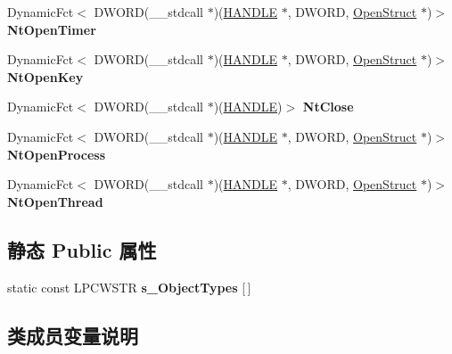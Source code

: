 \begin{DoxyCompactItemize}
\item 
\mbox{\label{struct_n_t_d_l_l_a043cad7dcc22e84d63e1c9cbe6cab085}} 
Dynamic\+Fct$<$ D\+W\+O\+RD(\+\_\+\+\_\+stdcall $\ast$)(\hyperlink{interfacevoid}{H\+A\+N\+D\+LE} $\ast$, D\+W\+O\+RD, \hyperlink{struct_open_struct}{Open\+Struct} $\ast$)$>$ {\bfseries Nt\+Open\+Timer}
\item 
\mbox{\label{struct_n_t_d_l_l_a61b5121698f86a91917ccb50536520f2}} 
Dynamic\+Fct$<$ D\+W\+O\+RD(\+\_\+\+\_\+stdcall $\ast$)(\hyperlink{interfacevoid}{H\+A\+N\+D\+LE} $\ast$, D\+W\+O\+RD, \hyperlink{struct_open_struct}{Open\+Struct} $\ast$)$>$ {\bfseries Nt\+Open\+Key}
\item 
\mbox{\label{struct_n_t_d_l_l_a85c90b85bb70246933e8ca0dce2451fc}} 
Dynamic\+Fct$<$ D\+W\+O\+RD(\+\_\+\+\_\+stdcall $\ast$)(\hyperlink{interfacevoid}{H\+A\+N\+D\+LE})$>$ {\bfseries Nt\+Close}
\item 
\mbox{\label{struct_n_t_d_l_l_a4f2567ac1d9266acf5e1b57215ebae99}} 
Dynamic\+Fct$<$ D\+W\+O\+RD(\+\_\+\+\_\+stdcall $\ast$)(\hyperlink{interfacevoid}{H\+A\+N\+D\+LE} $\ast$, D\+W\+O\+RD, \hyperlink{struct_open_struct}{Open\+Struct} $\ast$)$>$ {\bfseries Nt\+Open\+Process}
\item 
\mbox{\label{struct_n_t_d_l_l_a9fd54c40046765ccb87954b021a3e073}} 
Dynamic\+Fct$<$ D\+W\+O\+RD(\+\_\+\+\_\+stdcall $\ast$)(\hyperlink{interfacevoid}{H\+A\+N\+D\+LE} $\ast$, D\+W\+O\+RD, \hyperlink{struct_open_struct}{Open\+Struct} $\ast$)$>$ {\bfseries Nt\+Open\+Thread}
\end{DoxyCompactItemize}
\subsection*{静态 Public 属性}
\begin{DoxyCompactItemize}
\item 
static const L\+P\+C\+W\+S\+TR {\bfseries s\+\_\+\+Object\+Types} \mbox{[}$\,$\mbox{]}
\end{DoxyCompactItemize}


\subsection{类成员变量说明}
\mbox{\label{struct_n_t_d_l_l_a94443855885929d5ab3d5fb130a11249}} 
